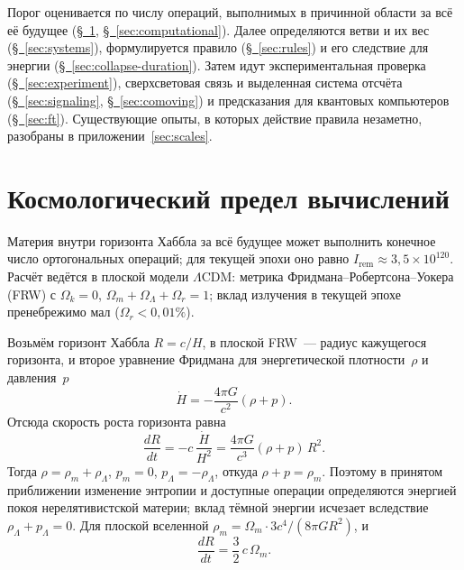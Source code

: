 \documentclass[11pt,a4paper]{article}
\newcommand{\Ost}{I_{\mathrm{rem}}}
\begin{document}
Порог оценивается по числу операций, выполнимых в причинной области за всё её будущее (\hyperref[sec:cosmological-limit]{\S~\ref*{sec:cosmological-limit}}, \hyperref[sec:computational]{\S~\ref*{sec:computational}}). Далее определяются ветви и их вес (\hyperref[sec:systems]{\S~\ref*{sec:systems}}), формулируется правило (\hyperref[sec:rules]{\S~\ref*{sec:rules}}) и его следствие для энергии (\hyperref[sec:collapse-duration]{\S~\ref*{sec:collapse-duration}}). Затем идут экспериментальная проверка (\hyperref[sec:experiment]{\S~\ref*{sec:experiment}}), сверхсветовая связь и выделенная система отсчёта (\hyperref[sec:signaling]{\S~\ref*{sec:signaling}}, \hyperref[sec:comoving]{\S~\ref*{sec:comoving}}) и предсказания для квантовых компьютеров (\hyperref[sec:ft]{\S~\ref*{sec:ft}}). Существующие опыты, в которых действие правила незаметно, разобраны в приложении~\ref{sec:scales}.

\section{Космологический предел вычислений}
\label{sec:cosmological-limit}

Материя внутри горизонта Хаббла за всё будущее может выполнить конечное число ортогональных операций; для текущей эпохи оно равно $\Ost\approx 3{,}5\times 10^{120}$. Расчёт ведётся в плоской модели $\Lambda$CDM: метрика Фридмана--Робертсона--Уокера (FRW) с $\Omega_k=0$, $\Omega_m+\Omega_\Lambda+\Omega_r=1$; вклад излучения в текущей эпохе пренебрежимо мал ($\Omega_r<0{,}01\%$).

Возьмём горизонт Хаббла $R=c/H$, в плоской FRW~--- радиус кажущегося горизонта, и второе уравнение Фридмана для энергетической плотности~$\rho$ и давления~$p$
\begin{equation}
\dot H = -\frac{4\pi G}{c^2}(\rho+p).
\end{equation}
Отсюда скорость роста горизонта равна
\begin{equation}
\frac{dR}{dt}
= -c\,\frac{\dot H}{H^2}
= \frac{4\pi G}{c^3}(\rho+p)\,R^2.
\end{equation}
Тогда $\rho=\rho_m+\rho_\Lambda$, $p_m=0$, $p_\Lambda=-\rho_\Lambda$, откуда $\rho+p=\rho_m$. Поэтому в принятом приближении изменение энтропии и доступные операции определяются энергией покоя нерелятивистской материи; вклад тёмной энергии исчезает вследствие $\rho_\Lambda+p_\Lambda=0$. Для плоской вселенной $\rho_m=\Omega_m\cdot 3c^4/(8\pi G R^2)$, и
\begin{equation}
\frac{dR}{dt} = \frac{3}{2}\,c\,\Omega_m.
\end{equation}
\end{document}
